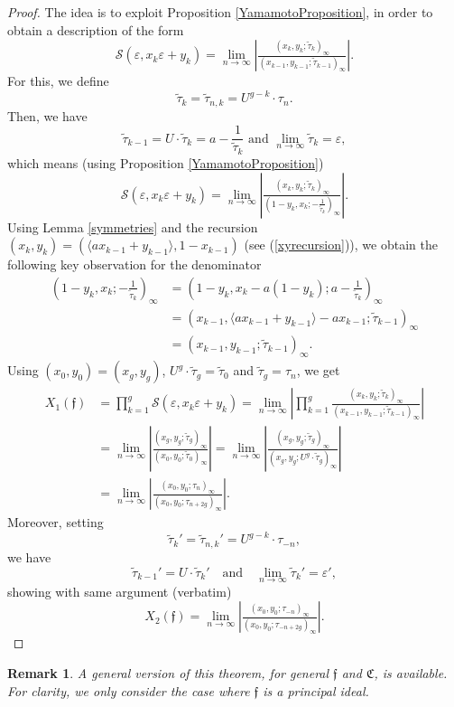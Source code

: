 \documentclass[11pt, a4paper]{amsart}
\newcommand{\ep}{\varepsilon}
\newcommand{\eq}[1]{\begin{equation}#1\end{equation}}
\theoremstyle{plain}
\newtheorem{remark}{Remark}[section]
\numberwithin{equation}{section}
\begin{document}
\begin{proof}

The idea is to exploit Proposition \ref{YamamotoProposition}, in order to obtain a description of the form \eq{\mathcal S(\ep,x_k\ep+y_k)=\lim_{n\to\infty}\left\vert \tfrac{(x_k,y_k;\tilde\tau_k)_\infty}{(x_{k-1},y_{k-1};\tilde\tau_{k-1})_\infty}\right\vert.} For this, we define \eq{\tilde \tau_k = \tilde \tau _{n,k} =  U^{g-k}\cdot \tau_{n}.} Then, we have \eq{\tilde \tau_{k-1} = U \cdot \tilde \tau_{k} = a - \frac {1} {\tilde \tau_k} \text{ \ \ \   and \ \ \    }\lim_{n\to \infty}\tilde \tau_k = \ep,} which means (using Proposition \ref{YamamotoProposition}) \eq{\mathcal S(\ep,x_k\ep+y_k) = \lim_{n\to \infty} \left \vert \tfrac{(x_k,y_k;\tilde \tau_k)_\infty}{(1-y_k,x_k;-\tfrac{1}{\tilde \tau _k})_\infty} \right \vert .} Using Lemma \ref{symmetries} and the recursion $(x_k,y_k) = (\langle a x_{k-1}+y_{k-1}\rangle,1-x_{k-1})$ (see (\ref{xyrecursion})), we obtain the following key observation for the denominator \begin{align}(1-y_k,x_k;-\tfrac{1}{\tilde \tau _k})_\infty &= (1-y_k,x_k-a(1-y_k);a-\tfrac{1}{\tilde \tau_k})_\infty \\ &= (x_{k-1},\langle a x_{k-1}+y_{k-1}\rangle-a x_{k-1};\tilde\tau_{k-1})_\infty \\&=(x_{k-1},y_{k-1};\tilde \tau _{k-1})_\infty.\end{align}
Using $(x_0,y_0)=(x_g,y_g)$, $U^g \cdot \tilde\tau_g = \tilde \tau_0$ and $\tilde\tau_g = \tau_n$, we get \begin{align}X_1(\mathfrak f) &= \prod_{k=1}^{g} \mathcal S(\ep,x_k\ep+y_k) = \lim_{n\to \infty}\left \vert\prod_{k=1}^{g} \tfrac{(x_k,y_k;\tilde\tau_k)_\infty}{(x_{k-1},y_{k-1};\tilde\tau_{k-1})_\infty} \right \vert \\ &= \lim_{n\to\infty}\left\vert \tfrac{(x_g,y_g;\tilde\tau_g)_\infty}{(x_0,y_0;\tilde\tau_0)_\infty} \right\vert = \lim_{n\to\infty}\left \vert \tfrac{(x_g,y_g;\tilde\tau_g)_\infty}{(x_g,y_g;U^{g}\cdot \tilde\tau_g)_\infty}\right\vert \\ &= \lim_{n\to \infty}\left\vert \tfrac{(x_0,y_0;\tau_n)_\infty}{(x_0,y_0;\tau_{n+2g})_\infty} \right\vert.\end{align}
Moreover, setting \eq{\tilde\tau_k' = \tilde\tau_{n,k}' = U^{g-k}\cdot \tau_{-n},} we have \eq{\tilde\tau_{k-1}' = U \cdot \tilde \tau_k' \ \ \  \text{ and } \ \ \  \lim_{n\to \infty}\tilde\tau_k' = \ep',} showing with same argument (verbatim) \eq{X_2(\mathfrak f) = \lim_{n\to \infty}\left\vert \tfrac{(x_0,y_0;\tau_{-n})_\infty}{(x_0,y_0;\tau_{-n+2g})_\infty} \right\vert.}
\end{proof}
\begin{remark}
A general version of this theorem, for general $\mathfrak f$ and $\mathfrak C$, is available. For clarity, we only consider the case where $\mathfrak f$ is a principal ideal. 
\end{remark}
\end{document}
